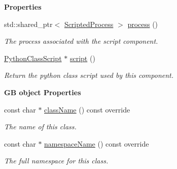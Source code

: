 \begin{Indent}\textbf{ Properties}\par
\begin{DoxyCompactItemize}
\item 
\mbox{\label{classrev_1_1_script_component_ada94eceb00866916e17188a067bee367}} 
std\+::shared\+\_\+ptr$<$ \mbox{\hyperlink{classrev_1_1_scripted_process}{Scripted\+Process}} $>$ \mbox{\hyperlink{classrev_1_1_script_component_ada94eceb00866916e17188a067bee367}{process}} ()
\begin{DoxyCompactList}\small\item\em The process associated with the script component. \end{DoxyCompactList}\item 
\mbox{\label{classrev_1_1_script_component_adc582fb9734167e0e4ba53a0b2760582}} 
\mbox{\hyperlink{classrev_1_1_python_class_script}{Python\+Class\+Script}} $\ast$ \mbox{\hyperlink{classrev_1_1_script_component_adc582fb9734167e0e4ba53a0b2760582}{script}} ()
\begin{DoxyCompactList}\small\item\em Return the python class script used by this component. \end{DoxyCompactList}\end{DoxyCompactItemize}
\end{Indent}
\begin{Indent}\textbf{ GB object Properties}\par
\begin{DoxyCompactItemize}
\item 
const char $\ast$ \mbox{\hyperlink{classrev_1_1_script_component_a2665164dc38caad07e5759aec4563dee}{class\+Name}} () const override
\begin{DoxyCompactList}\small\item\em The name of this class. \end{DoxyCompactList}\item 
const char $\ast$ \mbox{\hyperlink{classrev_1_1_script_component_a469f8cd22b928cef2b98297b3b0285dd}{namespace\+Name}} () const override
\begin{DoxyCompactList}\small\item\em The full namespace for this class. \end{DoxyCompactList}\end{DoxyCompactItemize}
\end{Indent}
